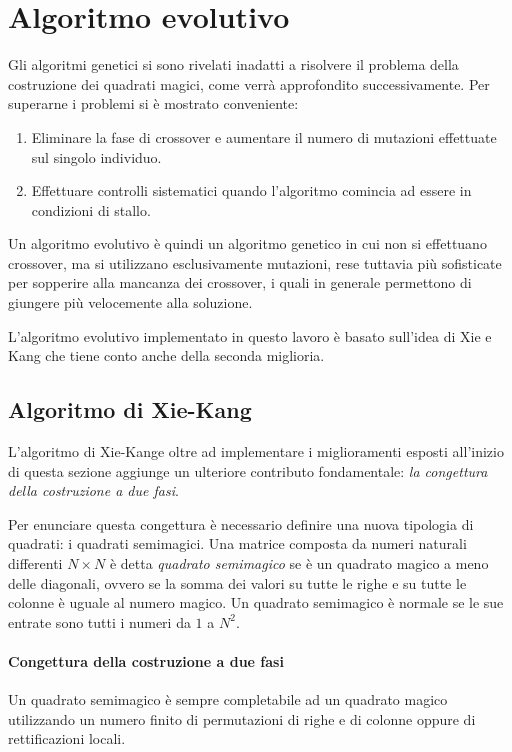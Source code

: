 \documentclass[italian,twoside,twocolumn]{article}
\begin{document}
\section{Algoritmo evolutivo}
Gli algoritmi genetici si sono rivelati inadatti a risolvere il problema della costruzione dei quadrati magici, come verrà approfondito successivamente. Per superarne i problemi si è mostrato conveniente:
\begin{enumerate}
	\item Eliminare la fase di crossover e aumentare il numero di mutazioni effettuate sul singolo individuo.
	\item Effettuare controlli sistematici quando l'algoritmo comincia ad essere in condizioni di stallo.
\end{enumerate}
Un algoritmo evolutivo è quindi un algoritmo genetico in cui non si effettuano crossover, ma si utilizzano esclusivamente mutazioni, rese tuttavia più sofisticate per sopperire alla mancanza dei crossover, i quali in generale permettono di giungere più velocemente alla soluzione. 

L'algoritmo evolutivo implementato in questo lavoro è basato sull'idea di Xie e Kang \cite{XieKang:2003} che tiene conto anche della seconda miglioria.

\subsection{Algoritmo di Xie-Kang}

L'algoritmo di Xie-Kange oltre ad implementare i miglioramenti esposti all'inizio di questa sezione aggiunge un ulteriore contributo fondamentale: \emph{la congettura della costruzione a due fasi}. 

Per enunciare questa congettura è necessario definire una nuova tipologia di quadrati: i quadrati semimagici. Una matrice composta da numeri naturali differenti $ N\times N $ è detta \emph{quadrato semimagico} se è un quadrato magico a meno delle diagonali, ovvero se la somma dei valori su tutte le righe e su tutte le colonne è uguale al numero magico. Un quadrato semimagico è normale se le sue entrate sono tutti i numeri da $ 1 $ a $ N^2 $. 

\paragraph{Congettura della costruzione a due fasi}
Un quadrato semimagico è sempre completabile ad un quadrato magico utilizzando un numero finito di permutazioni di righe e di colonne oppure di rettificazioni locali. 
\end{document}
